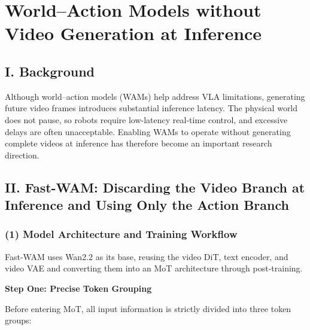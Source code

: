 \setcounter{section}{2}

\hypertarget{worldaction-models-without-video-generation-at-inference}{%
\section{World--Action Models without Video Generation at Inference}\label{worldaction-models-without-video-generation-at-inference}}

\hypertarget{i.-background-9}{%
\subsection{I. Background}\label{i.-background-9}}

Although world--action models (WAMs) help address VLA limitations, generating future video frames introduces substantial inference latency. The physical world does not pause, so robots require low-latency real-time control, and excessive delays are often unacceptable. Enabling WAMs to operate without generating complete videos at inference has therefore become an important research direction.

\hypertarget{ii.-fast-wam-discarding-the-video-branch-at-inference-and-using-only-the-action-branch}{%
\subsection{II. Fast-WAM: Discarding the Video Branch at Inference and Using Only the Action Branch}\label{ii.-fast-wam-discarding-the-video-branch-at-inference-and-using-only-the-action-branch}}

\hypertarget{model-architecture-and-training-workflow}{%
\subsubsection{(1) Model Architecture and Training Workflow}\label{model-architecture-and-training-workflow}}

Fast-WAM uses Wan2.2 as its base, reusing the video DiT, text encoder, and video VAE and converting them into an MoT architecture through post-training.

\textbf{Step One: Precise Token Grouping}

Before entering MoT, all input information is strictly divided into three token groups:

